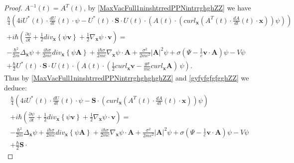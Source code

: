 \documentclass{article}
\theoremstyle{definition}
\theoremstyle{remark}
\renewcommand{\vec}[1]{\mathbf{#1}}
\newcommand{\er}{\eqref}
\newcommand{\er}{\eqref}
\begin{document}
\begin{proof}
$A^{-1}(t)=A^T(t)$, by \er{MaxVacFull1ninshtrredPPNintrrghghZZ} we
have
\begin{multline}\label{MaxVacFull1ninshtrredPPNintrrghghghghZZ}
\frac{\hbar}{4}\left(4iU^*(t)\cdot\frac{dU}{dt}(t)\cdot\psi-
U^*(t)\cdot\vec S\cdot U(t)\cdot\left(A(t)\cdot\left(curl_{\vec
x}\left(A^T(t)\cdot\frac{dA}{dt}(t)\cdot \vec
x\right)\right)\psi\right)\right)
\\+i\hbar
\left(\frac{\partial\psi}{\partial t}+\frac{1}{2}div_{\vec
x}\left\{\psi\vec v\right\}+\frac{1}{2}\nabla_{\vec x}\psi\cdot\vec
v\right) =\\-\frac{\hbar^2}{2m}\Delta_{\vec
x}\psi+\frac{i\hbar\sigma}{2mc}div_{\vec x}\left\{\psi\vec
A\right\}+\frac{i\hbar\sigma}{2mc}\nabla_{\vec x}\psi\cdot\vec
A+\frac{\sigma^2}{2mc^2}\left|\vec A\right|^2\psi
%
%
%
+\sigma\left(\Psi-\frac{1}{c}\vec v\cdot\vec
A\right)\psi-V\psi\\+\frac{\hbar}{2}U^*(t)\cdot\vec S\cdot
U(t)\cdot\left(A(t)\cdot\left(\frac{1}{2}curl_{\vec x}\vec
v-\frac{g\sigma}{mc}curl_{\vec x}\vec A\right)\,\psi\right).
\end{multline}
Thus by \er{MaxVacFull1ninshtrredPPNintrrghghghghZZ} and
\er{gyfyfgfgfgghZZ} we deduce:
\begin{multline}\label{MaxVacFull1ninshtrredPPNintrrghghghghuhjihZZ}
\frac{\hbar}{4}\left(4iU^*(t)\cdot\frac{dU}{dt}(t)\cdot\psi- \vec
S\cdot \left(curl_{\vec x}\left(A^T(t)\cdot\frac{dA}{dt}(t)\cdot
\vec x\right)\right)\psi\right)
\\+i\hbar
\left(\frac{\partial\psi}{\partial t}+\frac{1}{2}div_{\vec
x}\left\{\psi\vec v\right\}+\frac{1}{2}\nabla_{\vec x}\psi\cdot\vec
v\right) =\\-\frac{\hbar^2}{2m}\Delta_{\vec
x}\psi+\frac{i\hbar\sigma}{2mc}div_{\vec x}\left\{\psi\vec
A\right\}+\frac{i\hbar\sigma}{2mc}\nabla_{\vec x}\psi\cdot\vec
A+\frac{\sigma^2}{2mc^2}\left|\vec A\right|^2\psi
%
%
%
+\sigma\left(\Psi-\frac{1}{c}\vec v\cdot\vec
A\right)\psi-V\psi\\+\frac{\hbar}{2}\vec S\cdot

\end{multline}
\end{proof}
\end{document}
